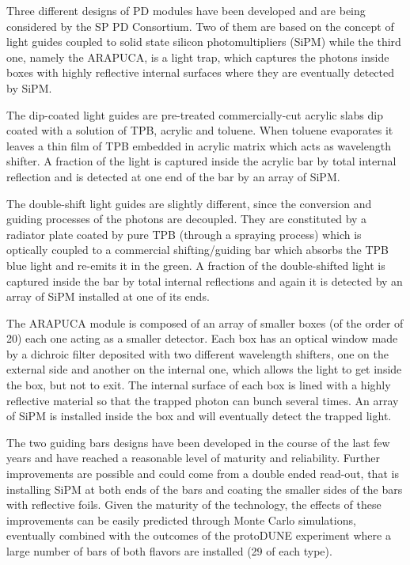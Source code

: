 Three different designs of PD modules have been developed and are being 
considered by the SP PD Consortium. Two of them are based on the concept of 
light guides coupled to solid state silicon photomultipliers (SiPM) while the 
third one, namely the ARAPUCA, is a light trap, which captures the photons inside
boxes with highly reflective internal surfaces where they are eventually detected by 
SiPM.

The dip-coated light guides are pre-treated commercially-cut acrylic slabs dip 
coated with a solution of TPB, acrylic and toluene. When toluene evaporates it 
leaves a thin film of TPB embedded in  acrylic matrix which acts as wavelength 
shifter. A fraction of the light is captured inside the acrylic bar by total 
internal reflection and is detected at one end of the bar by an array of SiPM.

The double-shift light guides are slightly different, since the conversion and 
guiding processes of the photons are decoupled. They are constituted by a 
radiator plate coated by pure TPB (through a spraying process) which is 
optically coupled to a commercial shifting/guiding bar which absorbs the TPB blue
light and re-emits it in the green. A fraction of the double-shifted light is 
captured inside the bar by total internal reflections and again it is detected by an 
array of SiPM installed at one of its ends.

The ARAPUCA module is composed of an array of smaller boxes (of the order of 
20) each one acting as a smaller detector. Each box has an optical window made 
by a dichroic filter deposited with two different wavelength shifters, one on 
the external side and another on the internal one, which allows the light to get
inside the box, but not to exit. The internal surface of each box is lined 
with a highly reflective material so that the trapped photon can bunch several 
times. An array of SiPM is installed inside the box and will eventually detect 
the trapped light.

The two guiding bars designs have been developed in the course of the last few 
years and have reached a reasonable level of maturity and reliability. Further 
improvements are possible and could come from a double ended read-out, that is 
installing SiPM at both ends of the bars and coating the smaller sides of the 
bars with reflective foils. Given the maturity of the technology, the effects 
of these improvements can be easily predicted through Monte Carlo simulations, 
eventually combined with the outcomes of the protoDUNE experiment where a 
large number of bars of both flavors are installed (29 of each type).

